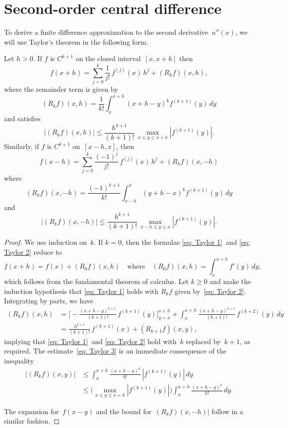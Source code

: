 \section{Second-order central difference}
To derive a finite difference approximation to the second derivative~$u''(x)$, 
we will use Taylor's theorem in the following form.

\begin{theorem}\label{thm: Taylor remainder}
Let $h>0$. If $f$ is $C^{k+1}$ on the closed interval~$[x,x+h]$ then
\begin{equation}\label{eq: Taylor 1}
f(x+h)=\sum_{j=0}^k\frac{1}{j!}\,f^{(j)}(x)\,h^j+(R_kf)(x,h),
\end{equation}
where the remainder term is given by
\begin{equation}\label{eq: Taylor 2}
(R_kf)(x,h)=\frac{1}{k!}\int_x^{x+h}(x+h-y)^kf^{(k+1)}(y)\,dy
\end{equation}
and satisfies
\begin{equation}\label{eq: Taylor 3}
|(R_kf)(x,h)|\le\frac{h^{k+1}}{(k+1)!}\,\max_{x\le y\le x+h}|f^{(k+1)}(y)|.
\end{equation}
Similarly, if $f$ is $C^{k+1}$ on~$[x-h,x]$, then
\[
f(x-h)=\sum_{j=0}^k\frac{(-1)^j}{j!}\,f^{(j)}(x)\,h^j+(R_kf)(x,-h)
\]
where 
\[
(R_kf)(x,-h)=\frac{(-1)^{k+1}}{k!}\int_{x-h}^x(y+h-x)^kf^{(k+1)}(y)\,dy
\]
and
\[
|(R_kf)(x,-h)|\le\frac{h^{k+1}}{(k+1)!}\,\max_{x-h\le y\le x}|f^{(k+1)}(y)|.
\]
\end{theorem}
\begin{proof}
We use induction on~$k$.  If $k=0$, then the formulae 
\eqref{eq: Taylor 1}~and \eqref{eq: Taylor 2} reduce to
\[
f(x+h)=f(x)+(R_0f)(x,h)\quad\text{where}\quad
(R_0f)(x,h)=\int_x^{x+h}f'(y)\,dy,
\]
which follows from the fundamental theorem of calculus.  Let $k\ge0$ and make 
the induction hypothesis that \eqref{eq: Taylor 1} holds with $R_kf$ given 
by~\eqref{eq: Taylor 2}.  Integrating by parts, we have
\begin{align*}
(R_kf)(x,h)&=\biggl[
	-\frac{(x+h-y)^{k+1}}{(k+1)!}\,f^{(k+1)}(y)\biggr]_{y=x}^{x+h}
	+\int_x^{x+h}\frac{(x+h-y)^{k+1}}{(k+1)!}\,f^{(k+2)}(y)\,dy\\
	&=\frac{h^{k+1}}{(k+1)!}\,f^{(k+1)}(x)+(R_{k+1}f)(x,y),
\end{align*}
implying that \eqref{eq: Taylor 1}~and \eqref{eq: Taylor 2} hold with~$k$
replaced by~$k+1$, as required.  The estimate~\eqref{eq: Taylor 3} is an 
immediate consequence of the inequality
\begin{align*}
|(R_kf)(x,y)|&\le\int_x^{x+h}\frac{(x+h-y)^k}{k!}\,|f^{(k+1)}(y)|\,dy\\
	&\le\biggl(\max_{x\le y\le x+h}|f^{(k+1)}(y)|\biggr)
	\int_x^{x+h}\frac{(x+h-y)^k}{k!}\,dy.
\end{align*}

The expansion for~$f(x-y)$ and the bound for~$(R_kf)(x,-h)|$ follow in a 
similar fashion.


\end{proof}


